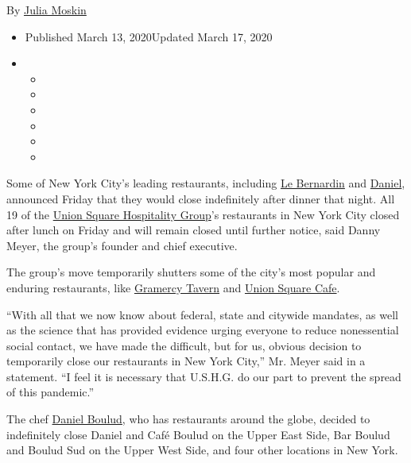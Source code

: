 By \href{https://www.nytimes3xbfgragh.onion/by/julia-moskin}{Julia
Moskin}

\begin{itemize}
\item
  Published March 13, 2020Updated March 17, 2020
\item
  \begin{itemize}
  \item
  \item
  \item
  \item
  \item
  \item
  \end{itemize}
\end{itemize}

Some of New York City's leading restaurants, including
\href{https://www.nytimes3xbfgragh.onion/2012/05/23/dining/reviews/le-bernardin-in-midtown-manhattan.html}{Le
Bernardin} and
\href{https://www.nytimes3xbfgragh.onion/2013/07/24/dining/reviews/restaurant-review-daniel-on-the-upper-east-side.html}{Daniel},
announced Friday that they would close indefinitely after dinner that
night. All 19 of the \href{https://www.ushgnyc.com/}{Union Square
Hospitality Group}'s restaurants in New York City closed after lunch on
Friday and will remain closed until further notice, said Danny Meyer,
the group's founder and chief executive.

The group's move temporarily shutters some of the city's most popular
and enduring restaurants, like
\href{https://www.nytimes3xbfgragh.onion/2016/08/17/dining/gramercy-tavern-review.html}{Gramercy
Tavern} and
\href{https://www.nytimes3xbfgragh.onion/2017/04/25/dining/union-square-cafe-review.html}{Union
Square Cafe}.

``With all that we now know about federal, state and citywide mandates,
as well as the science that has provided evidence urging everyone to
reduce nonessential social contact, we have made the difficult, but for
us, obvious decision to temporarily close our restaurants in New York
City,'' Mr. Meyer said in a statement. ``I feel it is necessary that
U.S.H.G. do our part to prevent the spread of this pandemic.''

The chef \href{https://www.danielboulud.com/}{Daniel Boulud}, who has
restaurants around the globe, decided to indefinitely close Daniel and
Café Boulud on the Upper East Side, Bar Boulud and Boulud Sud on the
Upper West Side, and four other locations in New York.

